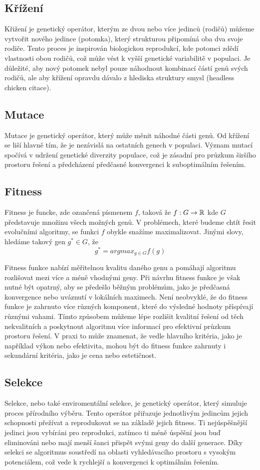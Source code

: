\subsection{Křížení}
Křižení je genetický operátor, kterým ze dvou nebo více jedinců (rodičů) můžeme vytvořit nového jedince (potomka), který strukturou připomíná oba dva svoje rodiče. Tento proces je inspirován biologickou reprodukcí, kde potomci zdědí vlastnosti obou rodičů, což může vést k vyšší genetické variabilitě v populaci. Je důležité, aby nový potomek nebyl pouze náhodnout kombinací částí genů svých rodičů, ale aby křížení opravdu dávalo z hlediska struktury smysl (headless chicken citace).

\subsection{Mutace}
Mutace je genetický operátor, který může měnit náhodné části genů. Od křížení se liší hlavně tím, že je nezávislá na ostatních genech v populaci. Význam mutací spočívá v udržení genetické diverzity populace, což je zásadní pro průzkum širšího prostoru řešení a předcházení předčasné konvergenci k suboptimálním řešením.

\subsection{Fitness}
Fitness je funcke, zde ozančená písmenem $f$, taková že $f: G \rightarrow \mathbb{R}$ kde $G$ představuje množinu všech možných genů. V problémech, které budeme chtít řesit evolučními algoritmy, se funkci $f$ obykle snažíme maximalizovat. Jinými slovy, hledáme takový gen $g^* \in G$, že 
$$g^* = argmax_{g \in G} f(g)$$

Fitness funkce nabízí měřitelnou kvalitu daného genu a pomáhají algoritmu rozlišovat mezi více a méně vhodnými geny. Při návrhu fitness funkce je však nutné být opatrný, aby se předešlo běžným problémům, jako je předčasná konvergence nebo uváznutí v lokálních maximech. Není neobvyklé, že do fitness funkce je zahrnuto více různých komponent, které do výsledné hodnoty příspívají různými vahami. Tímto způsobem můžeme lépe rozlišit kvalitní řešení od těch nekvalitních a poskytnout algoritmu více informací pro efektivní průzkum prostoru řešení. V praxi to může znamenat, že vedle hlavního kritéria, jako je například výkon nebo efektivita, mohou být do fitness funkce zahrnuty i sekundární kritéria, jako je cena nebo estetičnost.

\subsection{Selekce}
Selekce, nebo také enviromentální selekce, je genetický operátor, který simuluje proces přírodního výběru. Tento operátor přiřazuje jednotlivým jedincům jejich schopnosti přežívat a reprodukovat se na základě jejich fitness. Ti nejúspěšnější jedinci jsou vybíráni pro reprodukci, zatímco ti méně úspěšní jsou buď eliminováni nebo mají menší šanci přispět svými geny do další generace. Díky selekci se algoritmus soustředí na oblasti vyhledávacího prostoru s vysokým potenciálem, což vede k rychlejší a konvergenci k optimálním řešením. 

